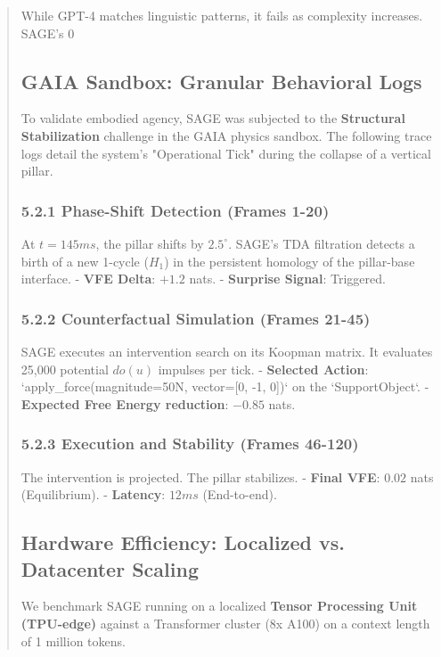 \documentclass[10pt,twocolumn,letterpaper]{article}
\begin{document}
\begin{abstract}
While GPT-4 matches linguistic patterns, it fails as complexity increases. SAGE’s 0%

\subsection{GAIA Sandbox: Granular Behavioral Logs}

To validate embodied agency, SAGE was subjected to the \textbf{Structural Stabilization} challenge in the GAIA physics sandbox. The following trace logs detail the system's "Operational Tick" during the collapse of a vertical pillar.

\subsubsection{5.2.1 Phase-Shift Detection (Frames 1-20)}
At $t=145ms$, the pillar shifts by $2.5^\circ$. SAGE's TDA filtration detects a birth of a new 1-cycle ($H_1$) in the persistent homology of the pillar-base interface.
- \textbf{VFE Delta}: $+1.2$ nats.
- \textbf{Surprise Signal}: Triggered.

\subsubsection{5.2.2 Counterfactual Simulation (Frames 21-45)}
SAGE executes an intervention search on its Koopman matrix. It evaluates 25,000 potential $do(u)$ impulses per tick.
- \textbf{Selected Action}: `apply_force(magnitude=50N, vector=[0, -1, 0])` on the `SupportObject`.
- \textbf{Expected Free Energy reduction}: $-0.85$ nats.

\subsubsection{5.2.3 Execution and Stability (Frames 46-120)}
The intervention is projected. The pillar stabilizes.
- \textbf{Final VFE}: $0.02$ nats (Equilibrium).
- \textbf{Latency}: $12ms$ (End-to-end).

\subsection{Hardware Efficiency: Localized vs. Datacenter Scaling}

We benchmark SAGE running on a localized \textbf{Tensor Processing Unit (TPU-edge)} against a Transformer cluster (8x A100) on a context length of 1 million tokens.


\end{abstract}
\end{document}
